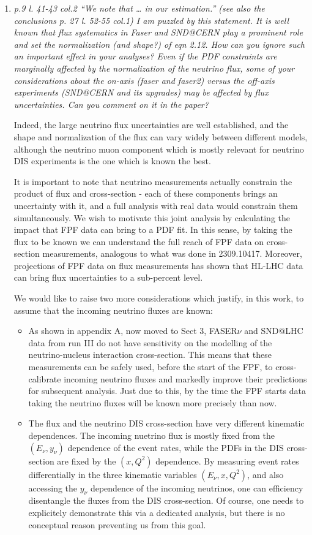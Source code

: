 \documentclass[11pt,a4paper]{article}
\begin{document}
\begin{enumerate}
\item{\it p.9 l. 41-43 col.2 “We note that … in our estimation.” (see also the conclusions p. 27 l. 52-55 col.1) I am puzzled by this statement. It is well known that flux systematics in Faser and SND@CERN play a prominent role and set the normalization (and shape?) of eqn 2.12. How can you ignore such an important effect in your analyses? Even if the PDF constraints are marginally affected by the normalization of the neutrino flux, some of your considerations about the on-axis (faser and faser2) versus the off-axis experiments (SND@CERN and its upgrades) may be affected by flux uncertainties. Can you comment on it in the paper?}

  Indeed, the large neutrino flux uncertainties are well established, and the shape and normalization of the flux can vary widely between different models, although the neutrino muon component which is mostly relevant for neutrino DIS experiments is the one which is known the best.

  It is important to note that neutrino measurements actually constrain the product of flux and cross-section - each of these components brings an uncertainty with it, and a full analysis with real data would constrain them simultaneously. We wish to motivate this joint analysis by calculating the  impact that FPF data can bring to a PDF fit. In this sense, by taking the flux to be known we can understand the full reach of FPF data on cross-section measurements, analogous to what was done in 2309.10417. Moreover, projections of FPF data on flux measurements has shown that HL-LHC data can bring flux uncertainties to a sub-percent level. 


  We would like to raise two more considerations which justify, in this work, to assume that the incoming neutrino
  fluxes are known:
  \begin{itemize}
  \item As shown in appendix A, now moved to Sect 3, FASER$\nu$ and SND@LHC data from run III do not have sensitivity on the modelling of the neutrino-nucleus interaction cross-section.
    This means that these measurements can be safely used, before the start of the FPF, to cross-calibrate
    incoming neutrino fluxes and markedly improve their predictions for subsequent analysis.
    Just due to this, by the time the FPF starts data taking the neutrino fluxes will be known
    more precisely than now.

  \item The flux and the neutrino DIS cross-section have very different kinematic dependences.
    The incoming nuetrino flux is mostly fixed from the $(E_\nu, y_\nu)$ dependence of the event rates,
    while the PDFs in the DIS cross-section are fixed by the $(x,Q^2)$ dependence.
    By measuring event rates differentially in the three kinematic variables $(E_\nu, x,Q^2)$, and also
    accessing the $y_\nu$ dependence of the incoming neutrinos, one can efficiency disentangle the
    fluxes from the DIS cross-section.
    Of course, one needs to explicitely demonstrate this via a dedicated analysis, but there
    is no conceptual reason preventing us from this goal.


\end{itemize}
\end{enumerate}
\end{document}
